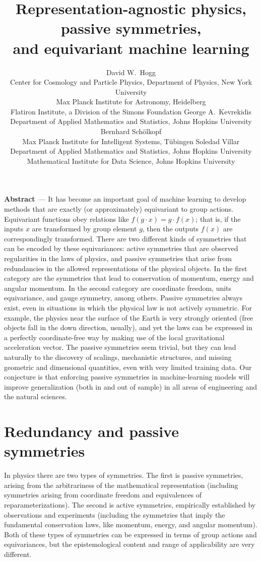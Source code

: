 \documentclass{article}
\title{Representation-agnostic physics, passive symmetries,\\ and equivariant machine learning}
\author{%
  David W.~Hogg\\
 Center for Cosmology and Particle Physics, Department of Physics, New York University\\
Max Planck Institute for Astronomy, Heidelberg\\
Flatiron Institute, a Division of the Simons Foundation
  \And
George A.~Kevrekidis\\
 Department of Applied Mathematics and Statistics, Johns Hopkins University
   \And
  Bernhard Sch\"olkopf\\
  Max Planck Institute for Intelligent Systems, T\"ubingen
  \And
  Soledad Villar\\
  Department of Applied Mathematics and Statistics, Johns Hopkins University\\
  Mathematical Institute for Data Science, Johns Hopkins University
}
\renewcommand{\paragraph}[1]{\par\textbf{#1}~---}
\begin{document}
\maketitle

\paragraph{Abstract} 
It has become an important goal of machine learning to develop methods that are exactly (or approximately) equivariant to group actions.
Equivariant functions obey relations like $f(g\cdot x) = g\cdot f(x)$; that is, if the inputs $x$ are transformed by group element $g$, then the outputs $f(x)$ are correspondingly transformed.
There are two different kinds of symmetries that can be encoded by these equivariances: active symmetries that are observed regularities in the laws of physics, and passive symmetries that arise from redundancies in the allowed representations of the physical objects. 
In the first category are the symmetries that lead to conservation of momentum, energy and angular momentum. In the second category are coordinate freedom, units equivariance, and gauge symmetry, among others.  
Passive symmetries always exist, even in situations in which the physical law is not actively symmetric.
For example, the physics near the surface of the Earth is very strongly oriented (free objects fall in the down direction, usually), and yet the laws can be expressed in a perfectly coordinate-free way by making use of the local gravitational acceleration vector.
The passive symmetries seem trivial, but they can lead naturally to the discovery of scalings, mechanistic structures, and missing geometric and dimensional quantities, even with very limited training data.
Our conjecture is that enforcing passive symmetries in machine-learning models will improve generalization (both in and out of sample) in all areas of engineering and the natural sciences.

\section{Redundancy and passive symmetries}

In physics there are two types of symmetries. 
The first is passive symmetries, arising from the arbitrariness of the mathematical representation (including symmetries arising from coordinate freedom and equivalences of reparameterizations).
The second is active symmetries, empirically established by observations and experiments (including the symmetries that imply the fundamental conservation laws, like momentum, energy, and angular momentum). Both of these types of symmetries can be expressed in terms of group actions and equivariances, but the epistemological content and range of applicability are very different. 
\end{document}
